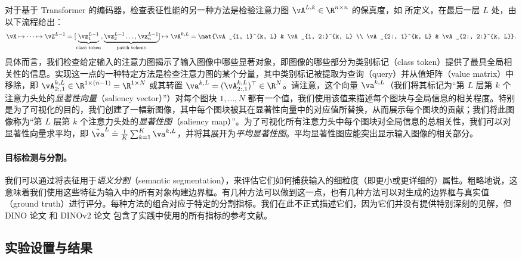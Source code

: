 \documentclass[../../book-main_zh.tex]{subfiles}
\begin{document}
对于基于 Transformer 的编码器，检查表征性能的另一种方法是检验注意力图 \(\vA^{L, k} \in \R^{n \times n}\) 的保真度，如  所定义，在最后一层 \(L\) 处，由以下流程给出：
\begin{align}
\vX \mapsto \cdots \mapsto \vZ^{L - 1} = [\underbrace{\vz_{1}^{L -
    1}}_{\text{class token}}, \underbrace{\vz_{2}^{L - 1} \dots,
\vz_{n}^{L - 1}}_{\text{patch tokens}}] \mapsto \vA^{k, L} =
\mat{\vA_{1, 1}^{k, L} & \vA_{1, 2:}^{k, L} \\ \vA_{2:, 1}^{k, L} &
\vA_{2:, 2:}^{k, L}}.
\end{align}
具体而言，我们检查给定输入的注意力图揭示了输入图像中哪些显著对象，即图像的哪些部分为类别标记（class token）提供了最具全局相关性的信息。实现这一点的一种特定方法是检查注意力图的某个分量，其中类别标记被提取为查询（query）并从值矩阵（value matrix）中移除，即 \(\vA_{2:, 1}^{k, L} \in \R^{1 \times (n - 1)} = \R^{1 \times N}\) 或其转置 \(\va^{k, L} = (\vA_{2:, 1}^{k, L})^{\top} \in \R^{N}\)。请注意，这个向量 \(\va^{k, L}\)（我们将其标记为“第 \(L\) 层第 \(k\) 个注意力头处的\textit{显著性向量}（saliency vector）”）对每个图块 \(1, \dots, N\) 都有一个值，我们使用该值来描述每个图块与全局信息的相关程度。特别是为了可视化的目的，我们创建了一幅新图像，其中每个图块被其在显著性向量中的对应值所替换，从而展示每个图块的贡献；我们将此图像称为“第 \(L\) 层第 \(k\) 个注意力头处的\textit{显著性图}（saliency map）”。为了可视化所有注意力头中每个图块对全局信息的总相关性，我们可以对显著性向量求平均，即 \(\tilde{\va}^{L} \doteq \frac{1}{K}\sum_{k =
1}^{K}\va^{k, L}\)，并将其展开为\textit{平均显著性图}。平均显著性图应能突出显示输入图像的相关部分。

\paragraph{目标检测与分割。}

我们可以通过将表征用于\textit{语义分割}（semantic segmentation），来评估它们如何捕获输入的细粒度（即更小或更详细的）属性。粗略地说，这意味着我们使用这些特征为输入中的所有对象构建边界框。有几种方法可以做到这一点，也有几种方法可以对生成的边界框与真实值（ground truth）进行评分。每种方法的组合对应于特定的分割指标。我们在此不正式描述它们，因为它们并没有提供特别深刻的见解，但 DINO 论文 \citep{caron2021emerging} 和 DINOv2 论文 \citep{oquab2023dinov2} 包含了实践中使用的所有指标的参考文献。

\subsection{实验设置与结果}
\label{sub:contrastive_learning_experiment_results}
\end{document}
